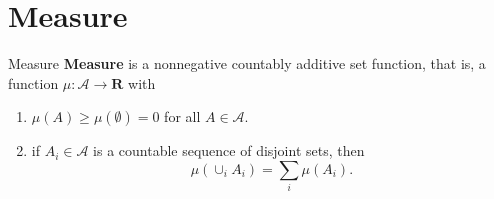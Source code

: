 \section{Measure}

\begin{definition}{Measure}{}
    \textbf{Measure} is a nonnegative countably additive set function, that is, a function $\mu:\mathcal{A}\rightarrow\mathbf{R}$ with
    \begin{enumerate}
        \item $\mu(A)\geq\mu(\emptyset)=0$ for all $A\in\mathcal{A}$.
        \item if $A_i\in\mathcal{A}$ is a countable sequence of disjoint sets, then $$\mu(\cup_iA_i)=\sum_i\mu(A_i).$$
    \end{enumerate}
\end{definition}





